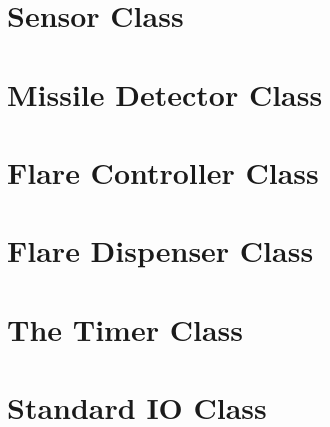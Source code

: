 \documentclass[\pformat,12pt]{article}
\begin{document}


\section{Sensor Class}



\section{Missile Detector Class}



\section{Flare Controller Class}



\section{Flare Dispenser Class}



\section{The Timer Class}



\section{Standard IO Class}


\end{document}
